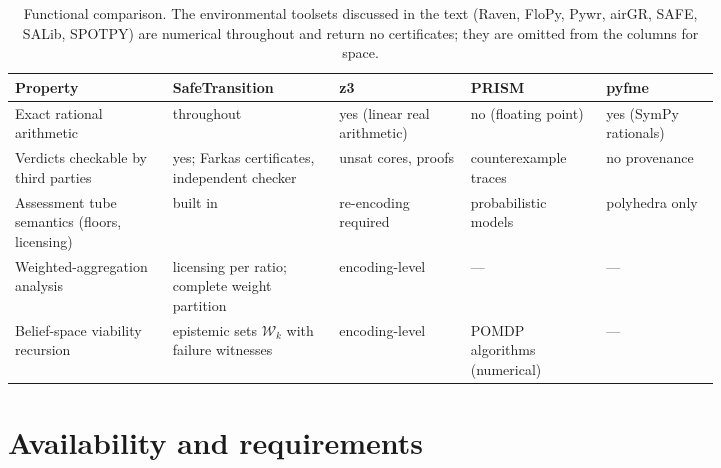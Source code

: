 \documentclass[3p,11pt]{elsarticle}
\begin{document}
\begin{table}[t]
\centering
\small
\setlength{\tabcolsep}{3pt}
\begin{tabular}{@{}p{0.185\linewidth}p{0.19\linewidth}p{0.155\linewidth}p{0.15\linewidth}p{0.135\linewidth}@{}}
\toprule
Property & SafeTransition & z3 & PRISM & pyfme \\
\midrule
Exact rational arithmetic & throughout & yes (linear real arithmetic) & no (floating point) & yes (SymPy rationals) \\
Verdicts checkable by third parties & yes; Farkas certificates, independent checker & unsat cores, proofs & counterexample traces & no provenance \\
Assessment tube semantics (floors, licensing) & built in & re-encoding required & probabilistic models & polyhedra only \\
Weighted-aggregation analysis & licensing per ratio; complete weight partition & encoding-level & --- & --- \\
Belief-space viability recursion & epistemic sets $\mathcal{W}_k$ with failure witnesses & encoding-level & POMDP algorithms (numerical) & --- \\
\bottomrule
\end{tabular}
\caption{Functional comparison. The environmental toolsets discussed in the
text (Raven, FloPy, Pywr, airGR, SAFE, SALib, SPOTPY) are numerical
throughout and return no certificates; they are omitted from the columns
for space.}
\label{tab:compare}
\end{table}

\section{Availability and requirements}\label{sec:availability}
\end{document}
